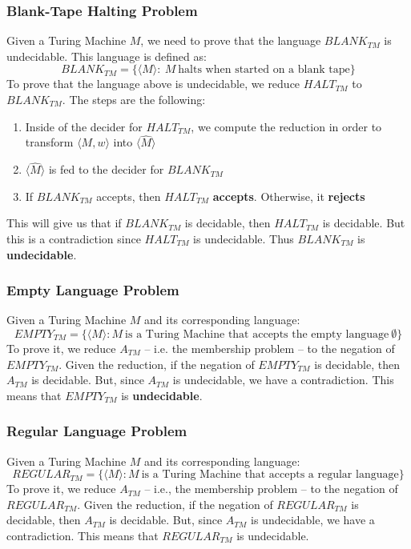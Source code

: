 \documentclass{article}
\begin{document}
\subsubsection{Blank-Tape Halting Problem}
Given a Turing Machine $M$, we need to prove that the language $BLANK_{TM}$ is undecidable. This language is defined as:
\[ BLANK_{TM} = \{ \langle M \rangle:~M~\text{halts when started on a blank tape} \} \]
To prove that the language above is undecidable, we reduce $HALT_{TM}$ to $BLANK_{TM}$. The steps are the following:

\begin{enumerate}
	\item Inside of the decider for $HALT_{TM}$, we compute the reduction in order to transform $\langle M, w \rangle$ into $\langle \hat M \rangle$
	\item $\langle \hat M \rangle$ is fed to the decider for $BLANK_{TM}$
	\item If $BLANK_{TM}$ accepts, then $HALT_{TM}$ \textbf{accepts}. Otherwise, it \textbf{rejects}
\end{enumerate}
This will give us that if $BLANK_{TM}$ is decidable, then $HALT_{TM}$ is decidable. But this is a contradiction since $HALT_{TM}$ is undecidable. Thus $BLANK_{TM}$ is \textbf{undecidable}.

\subsubsection{Empty Language Problem}
Given a Turing Machine $M$ and its corresponding language:
\[ EMPTY_{TM} = \{ \langle M \rangle : M~\text{is a Turing Machine that accepts the empty language}~\emptyset \} \]
To prove it, we reduce $A_{TM}$ -- i.e. the membership problem -- to the negation of $EMPTY_{TM}$. Given the reduction, if the negation of $EMPTY_{TM}$ is decidable, then $A_{TM}$ is decidable. But, since $A_{TM}$ is undecidable, we have a contradiction. This means that $EMPTY_{TM}$ is \textbf{undecidable}.

\subsubsection{Regular Language Problem}
Given a Turing Machine $M$ and its corresponding language:
\[ REGULAR_{TM} = \{ \langle M \rangle: M~\text{is a Turing Machine that accepts a regular language} \} \]
To prove it, we reduce $A_{TM}$ -- i.e., the membership problem -- to the negation of $REGULAR_{TM}$. Given the reduction, if the negation of $REGULAR_{TM}$ is decidable, then $A_{TM}$ is decidable. But, since $A_{TM}$ is undecidable, we have a contradiction. This means that $REGULAR_{TM}$ is undecidable.
\end{document}
